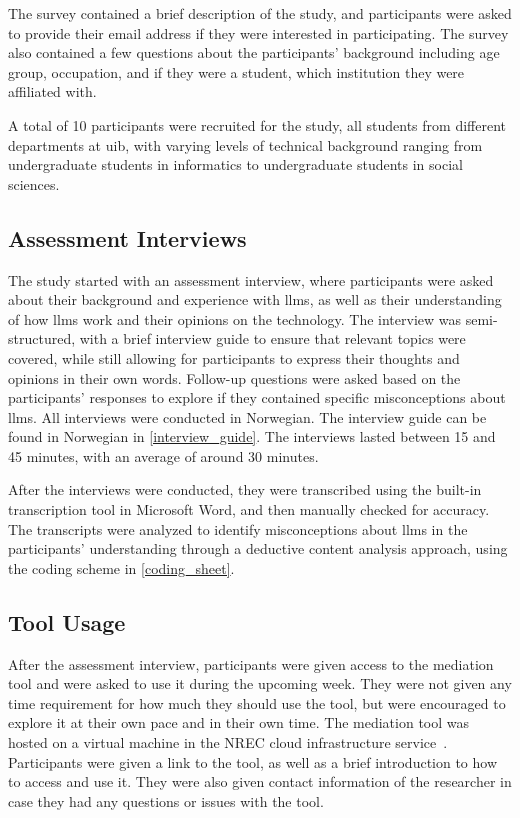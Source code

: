 The survey contained a brief description of the study, and participants were asked to provide their email address if they were interested in participating. The survey also contained a few questions about the participants' background including age group, occupation, and if they were a student, which institution they were affiliated with. 

A total of 10 participants were recruited for the study, all students from different departments at \gls{uib}, with varying levels of technical background ranging from undergraduate students in informatics to undergraduate students in social sciences.

\subsection{Assessment Interviews}
The study started with an assessment interview, where participants were asked about their background and experience with \gls{llms}, as well as their understanding of how \gls{llms} work and their opinions on the technology. The interview was semi-structured, with a brief interview guide to ensure that relevant topics were covered, while still allowing for participants to express their thoughts and opinions in their own words. Follow-up questions were asked based on the participants' responses to explore if they contained specific misconceptions about \gls{llms}. All interviews were conducted in Norwegian. The interview guide can be found in Norwegian in \autoref{interview_guide}. The interviews lasted between 15 and 45 minutes, with an average of around 30 minutes.

After the interviews were conducted, they were transcribed using the built-in transcription tool in Microsoft Word, and then manually checked for accuracy. The transcripts were analyzed to identify misconceptions about \gls{llms} in the participants' understanding through a deductive content analysis approach, using the coding scheme in \autoref{coding_sheet}.
\subsection{Tool Usage}
After the assessment interview, participants were given access to the mediation tool and were asked to use it during the upcoming week. They were not given any time requirement for how much they should use the tool, but were encouraged to explore it at their own pace and in their own time. The mediation tool was hosted on a virtual machine in the NREC cloud infrastructure service~\cite{nrec}. Participants were given a link to the tool, as well as a brief introduction to how to access and use it. They were also given contact information of the researcher in case they had any questions or issues with the tool.
